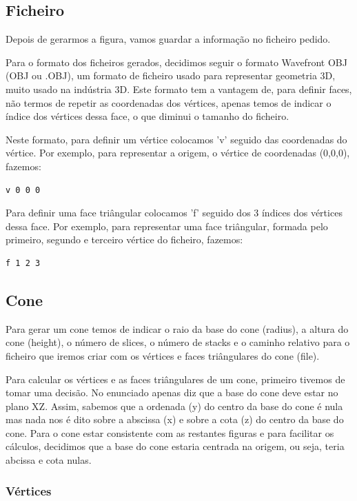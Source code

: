 \documentclass[12pt, a4paper]{article}
\begin{document}
\subsection{Ficheiro}
Depois de gerarmos a figura, vamos guardar a informação no ficheiro pedido.

Para o formato dos ficheiros gerados, decidimos seguir o formato Wavefront OBJ (OBJ ou .OBJ),
um formato de ficheiro usado para representar geometria 3D, muito usado na indústria 3D.
Este formato tem a vantagem de, para definir faces, não termos de repetir as coordenadas dos
vértices, apenas temos de indicar o índice dos vértices dessa face, o que diminui o tamanho do
ficheiro.

Neste formato, para definir um vértice colocamos 'v' seguido das coordenadas do vértice.
Por exemplo, para representar a origem, o vértice de coordenadas (0,0,0), fazemos:
\begin{verbatim}
v 0 0 0
\end{verbatim}
Para definir uma face triângular colocamos 'f' seguido dos 3 índices dos vértices dessa face.
Por exemplo, para representar uma face triângular, formada pelo primeiro, segundo e terceiro
vértice do ficheiro, fazemos:
\begin{verbatim}
f 1 2 3
\end{verbatim}

\subsection{Cone}
Para gerar um cone temos de indicar o raio da base do cone (radius), a altura do
cone (height), o número de slices, o número de stacks e o caminho relativo para o
ficheiro que iremos criar com os vértices e faces triângulares do cone (file).

Para calcular os vértices e as faces triângulares de um cone, primeiro tivemos
de tomar uma decisão. No enunciado apenas diz que a base do cone deve estar no
plano XZ. Assim, sabemos que a ordenada (y) do centro da base do cone é nula
mas nada nos é dito sobre a abscissa (x) e sobre a cota (z) do centro da base
do cone. Para o cone estar consistente com as restantes figuras e para facilitar
os cálculos, decidimos que a base do cone estaria centrada na origem, ou seja,
teria abcissa e cota nulas.

\subsubsection{Vértices}
\end{document}
